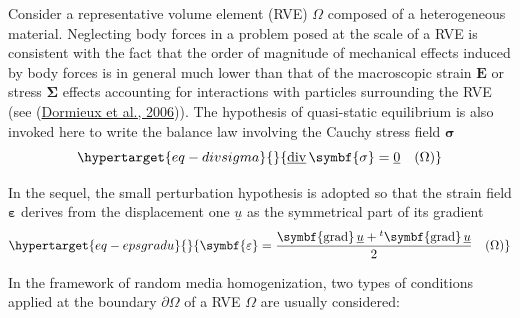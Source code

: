\documentclass[
  letterpaper,
  DIV=11,
  numbers=noendperiod]{scrreprt}
\newcommand{\uu}[1]{{\symbf{{#1}}}}
\newcommand{\uv}[1]{{\underline{{#1}}}}
\newcommand{\eps}{{\uu{{\varepsilon}}}}
\newcommand{\E}{{\uu{{E}}}}
\newcommand{\sig}{{\uu{{\sigma}}}}
\newcommand{\Sig}{{\uu{{\Sigma}}}}
\newcommand{\trans}[1]{{{}^{t}{#1}}}
\DeclareMathOperator{\divu}{\uv{div}}
\DeclareMathOperator{\graduu}{\uu{grad}}
\begin{document}
Consider a representative volume element (RVE) \(\Omega\) composed of a
heterogeneous material. Neglecting body forces in a problem posed at the
scale of a RVE is consistent with the fact that the order of magnitude
of mechanical effects induced by body forces is in general much lower
than that of the macroscopic strain \(\E\) or stress \(\Sig\) effects
accounting for interactions with particles surrounding the RVE (see
(\protect\hyperlink{ref-dormieux2006}{Dormieux et al., 2006})). The
hypothesis of quasi-static equilibrium is also invoked here to write the
balance law involving the Cauchy stress field \(\sig\)
\begin{equation}\protect\hypertarget{eq-divsigma}{}{
\divu{\sig}=\uv{0} \quad(\Omega)
}\label{eq-divsigma}\end{equation}

In the sequel, the small perturbation hypothesis is adopted so that the
strain field \(\eps\) derives from the displacement one \(\uv{u}\) as
the symmetrical part of its gradient
\begin{equation}\protect\hypertarget{eq-epsgradu}{}{
\eps=\frac{\graduu{\uv{u}}+\trans{\graduu{\uv{u}}}}{2} \quad(\Omega)
}\label{eq-epsgradu}\end{equation}

In the framework of random media homogenization, two types of conditions
applied at the boundary \(\partial\Omega\) of a RVE \(\Omega\) are
usually considered:
\end{document}
